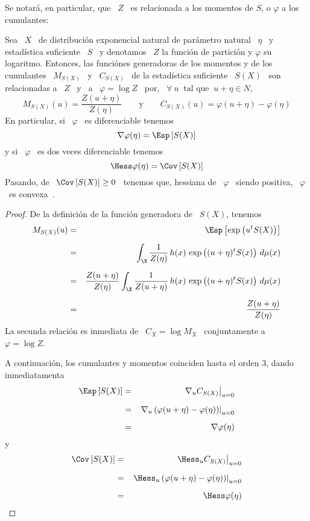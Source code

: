 Se notar\'a, en particular, que \ $Z$  \ es relacionada a los momentos de $S$, o
$\varphi$ a los cumulantes:
%
\begin{teorema}
%
  Sea \  $X$ \  de distribuci\'on exponencial  natural de par\'ametro  natural \
  $\eta$ \ y estad\'istica suficiente \ $S$  \ y denotamos \ $Z$ la funci\'on de
  partici\'on y  $\varphi$ su logaritmo.  Entonces,  las funci\'ones generadoras
  de los  momentos y de  los cumulantes \  $M_{S(X)}$ \ y  \ $C_{S(X)}$ \  de la
  estad\'istica  suficiente \  $S(X)$ \  son relacionadas  a  \ $Z$  \ y  \ a  \
  $\varphi = \log  Z$ \ por, \ $\forall \:  u \: \mbox{ tal que  } \: u+\eta \in
  N$,
  \[
  M_{S(X)}(u) =  \frac{Z(u+\eta)}{Z(\eta)} \qquad \mbox{y}  \qquad C_{S(X)}(u) =
  \varphi(u+\eta) - \varphi(\eta)
  \]
  En particular, si \  $\varphi$ \ es diferenciable tenemos
  \[
  \nabla \varphi (\eta) = \Esp\left[ S(X) \right]
  \]
  y si \ $\varphi$ \ es dos veces diferenciable tenemos
  \[
  \Hess \varphi (\eta) = \Cov\left[ S(X) \right]
  \]
  Pasando, de  \ $\Cov\left[ S(X)  \right] \ge 0$  \ tenemos que, hessiana  de \
  $\varphi$ \ siendo positiva, \ $\varphi$ \ es convexa~\cite{CamMar09}.
%
\end{teorema}
%
\begin{proof}
  De la definici\'on de la funci\'on generadora de \ $S(X)$, tenemos
  \begin{eqnarray*}
  M_{S(X)}(u) & = &\Esp\left[ \exp\left( u^t S(X) \right) \right]\\[2mm]
  & = & \int_\X \frac{1}{Z(\eta)} \, h(x) \, \exp\left( (u + \eta)^t S(x) \right) \,
  d\mu(x)\\[2mm]
  & = & \frac{Z(u+\eta)}{Z(\eta)} \int_\X \frac{1}{Z(u+\eta)} \, h(x) \,
  \exp\left( (u + \eta)^t S(x) \right) \, d\mu(x)\\[2mm]
  & = &  \frac{Z(u+\eta)}{Z(\eta)}
  \end{eqnarray*}
  La secunda  relaci\'on es inmediata  de \ $C_X  = \log M_X$ \  conjuntamente a
  \ $\varphi = \log Z$.

  A continuaci\'on, los cumulantes y momentos coinciden hasta el orden $3$, dando inmediatamenta
  \begin{eqnarray*}
  \Esp\left[ S(X) \right] & = & \left. \nabla_u C_{S(X)} \right|_{u=0}\\[2mm]
  & = & \left. \nabla_u \left( \varphi(u+\eta) - \varphi(\eta) \right) \right|_{u=0}\\[2mm]
  & = & \nabla \varphi(\eta)
  \end{eqnarray*}
  y
  \begin{eqnarray*}
  \Cov\left[ S(X) \right] & = & \left. \Hess_u C_{S(X)} \right|_{u=0}\\[2mm]
  & = & \left. \Hess_u \left( \varphi(u+\eta) - \varphi(\eta)  \right) \right|_{u=0}\\[2mm]
  & = & \Hess \varphi(\eta)
  \end{eqnarray*}
\end{proof}


